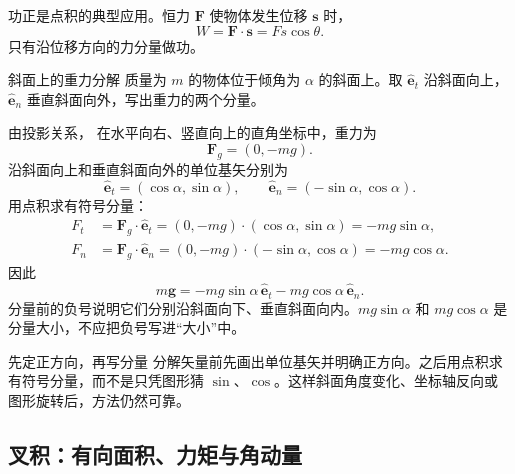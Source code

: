 \documentclass[UTF8,zihao=-4,oneside,openany]{ctexbook}
\numberwithin{equation}{section}
\newcommand{\vect}[1]{\bm{#1}}
\newcommand{\uvec}[1]{\hat{\vect{#1}}}
\begin{document}
功正是点积的典型应用。恒力 $\vect F$ 使物体发生位移 $\vect s$ 时，
\[
  W=\vect F\cdot\vect s=Fs\cos\theta.
\]
只有沿位移方向的力分量做功。

\begin{examplebox}{斜面上的重力分解}
质量为 $m$ 的物体位于倾角为 $\alpha$ 的斜面上。取 $\uvec e_t$ 沿斜面向上，$\uvec e_n$ 垂直斜面向外，写出重力的两个分量。

\tcblower
\begin{center}
\end{center}
由投影关系，
在水平向右、竖直向上的直角坐标中，重力为
\[
  \vect F_g=(0,-mg).
\]
沿斜面向上和垂直斜面向外的单位基矢分别为
\[
  \uvec e_t=(\cos\alpha,\sin\alpha),
  \qquad
  \uvec e_n=(-\sin\alpha,\cos\alpha).
\]
用点积求有符号分量：
\begin{align*}
  F_t&=\vect F_g\cdot\uvec e_t
  =(0,-mg)\cdot(\cos\alpha,\sin\alpha)
  =-mg\sin\alpha,\\
  F_n&=\vect F_g\cdot\uvec e_n
  =(0,-mg)\cdot(-\sin\alpha,\cos\alpha)
  =-mg\cos\alpha.
\end{align*}
因此
\[
  m\vect g=-mg\sin\alpha\,\uvec e_t-mg\cos\alpha\,\uvec e_n.
\]
分量前的负号说明它们分别沿斜面向下、垂直斜面向内。$mg\sin\alpha$ 和 $mg\cos\alpha$ 是分量大小，不应把负号写进“大小”中。
\end{examplebox}

\begin{methodbox}{先定正方向，再写分量}
分解矢量前先画出单位基矢并明确正方向。之后用点积求有符号分量，而不是只凭图形猜 $\sin$、$\cos$。这样斜面角度变化、坐标轴反向或图形旋转后，方法仍然可靠。
\end{methodbox}

\subsection{叉积：有向面积、力矩与角动量}
\end{document}
